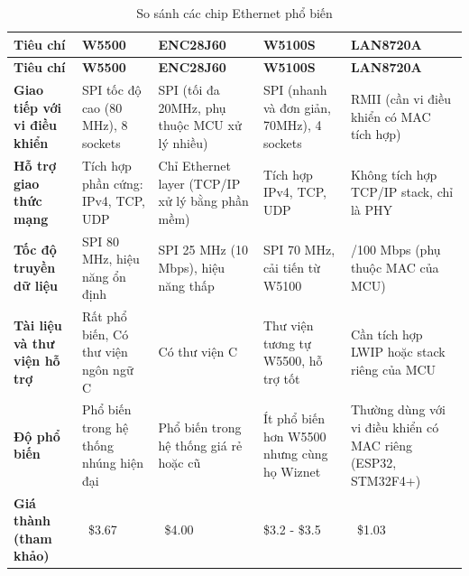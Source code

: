 \begin{longtable}{|>{\raggedright\arraybackslash}p{1.5cm}|>{\raggedright\arraybackslash}p{2.7cm}|>{\raggedright\arraybackslash}p{2.7cm}|>{\raggedright\arraybackslash}p{2.7cm}|>{\raggedright\arraybackslash}p{2.7cm}|}

\caption{So sánh các chip Ethernet phổ biến} \\
\hline
\textbf{Tiêu chí} & \textbf{W5500}\cite{wiznet_w5500} & \textbf{ENC28J60}\cite{ENC28J60_Data_Sheet} & \textbf{W5100S}\cite{wiznet_W5100S} & \textbf{LAN8720A\cite{LAN8720A_Data_Sheet}} \\
\hline
\endfirsthead

\hline
\textbf{Tiêu chí} & \textbf{W5500} & \textbf{ENC28J60} & \textbf{W5100S} & \textbf{LAN8720A} \\
\hline
\endhead

\hline
\endfoot

\hline
\endlastfoot

\textbf{Giao tiếp với vi điều khiển} & 
SPI tốc độ cao (80 MHz), 8 sockets & 
SPI (tối đa 20MHz, phụ thuộc MCU xử lý nhiều) & 
SPI (nhanh và đơn giản, 70MHz), 4 sockets & 
RMII (cần vi điều khiển có MAC tích hợp) \\
\hline

\textbf{Hỗ trợ giao thức mạng} & 
Tích hợp phần cứng: IPv4, TCP, UDP & 
Chỉ Ethernet layer (TCP/IP xử lý bằng phần mềm) & 
Tích hợp IPv4, TCP, UDP & 
Không tích hợp TCP/IP stack, chỉ là PHY \\
\hline

\textbf{Tốc độ truyền dữ liệu} & 
SPI 80 MHz, hiệu năng ổn định & 
SPI 25 MHz (10 Mbps), hiệu năng thấp  & 
SPI 70 MHz, cải tiến từ W5100 & 
10/100 Mbps (phụ thuộc MAC của MCU) \\ 
\hline

\textbf{Tài liệu và thư viện hỗ trợ} & 
Rất phổ biến, Có thư viện ngôn ngữ C & 
Có thư viện C & 
Thư viện tương tự W5500, hỗ trợ tốt & 
Cần tích hợp LWIP hoặc stack riêng của MCU \\
\hline

\textbf{Độ phổ biến} & 
Phổ biến trong hệ thống nhúng hiện đại & 
Phổ biến trong hệ thống giá rẻ hoặc cũ & 
Ít phổ biến hơn W5500 nhưng cùng họ Wiznet & 
Thường dùng với vi điều khiển có MAC riêng (ESP32, STM32F4+) \\
\hline

\textbf{Giá thành (tham khảo)} & 
~\$3.67 & 
~\$4.00 & 
\$3.2 - \$3.5 & 
~\$1.03 \\
\hline

\end{longtable}

